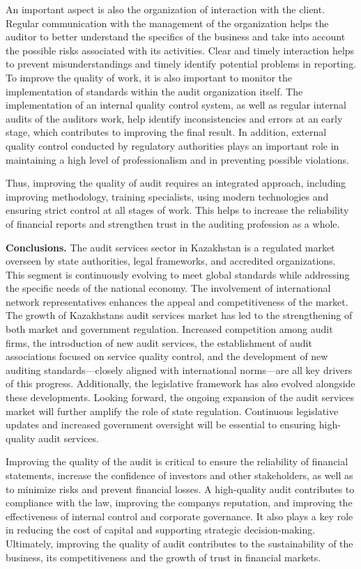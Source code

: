 \begin{multicols}{2}
An important aspect is also the organization of interaction with the
client. Regular communication with the management of the organization
helps the auditor to better understand the specifics of the business and
take into account the possible risks associated with its activities.
Clear and timely interaction helps to prevent misunderstandings and
timely identify potential problems in reporting. To improve the quality
of work, it is also important to monitor the implementation of standards
within the audit organization itself. The implementation of an internal
quality control system, as well as regular internal audits of the
auditors\textquotesingle{} work, help identify inconsistencies and
errors at an early stage, which contributes to improving the final
result. In addition, external quality control conducted by regulatory
authorities plays an important role in maintaining a high level of
professionalism and in preventing possible violations.

Thus, improving the quality of audit requires an integrated approach,
including improving methodology, training specialists, using modern
technologies and ensuring strict control at all stages of work. This
helps to increase the reliability of financial reports and strengthen
trust in the auditing profession as a whole.

\textbf{Conclusions.} The audit services sector in Kazakhstan is a
regulated market overseen by state authorities, legal frameworks, and
accredited organizations. This segment is continuously evolving to meet
global standards while addressing the specific needs of the national
economy. The involvement of international network representatives
enhances the appeal and competitiveness of the market. The growth of
Kazakhstan\textquotesingle s audit services market has led to the
strengthening of both market and government regulation. Increased
competition among audit firms, the introduction of new audit services,
the establishment of audit associations focused on service quality
control, and the development of new auditing standards---closely aligned
with international norms---are all key drivers of this progress.
Additionally, the legislative framework has also evolved alongside these
developments. Looking forward, the ongoing expansion of the audit
services market will further amplify the role of state regulation.
Continuous legislative updates and increased government oversight will
be essential to ensuring high-quality audit services.

Improving the quality of the audit is critical to ensure the reliability
of financial statements, increase the confidence of investors and other
stakeholders, as well as to minimize risks and prevent financial losses.
A high-quality audit contributes to compliance with the law, improving
the company\textquotesingle s reputation, and improving the
effectiveness of internal control and corporate governance. It also
plays a key role in reducing the cost of capital and supporting
strategic decision-making. Ultimately, improving the quality of audit
contributes to the sustainability of the business, its competitiveness
and the growth of trust in financial markets.
\end{multicols}

